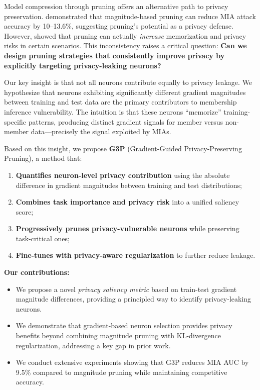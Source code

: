 \documentclass[11pt]{article}
\begin{document}
Model compression through pruning offers an alternative path to privacy preservation. \citet{wang2021against} demonstrated that magnitude-based pruning can reduce MIA attack accuracy by 10--13.6\%, suggesting pruning's potential as a privacy defense. However, \citet{yuan2022membership} showed that pruning can actually \emph{increase} memorization and privacy risks in certain scenarios. This inconsistency raises a critical question: \textbf{Can we design pruning strategies that consistently improve privacy by explicitly targeting privacy-leaking neurons?}

Our key insight is that not all neurons contribute equally to privacy leakage. We hypothesize that neurons exhibiting significantly different gradient magnitudes between training and test data are the primary contributors to membership inference vulnerability. The intuition is that these neurons ``memorize'' training-specific patterns, producing distinct gradient signals for member versus non-member data---precisely the signal exploited by MIAs.

Based on this insight, we propose \textbf{G3P} (Gradient-Guided Privacy-Preserving Pruning), a method that:
\begin{enumerate}
    \item \textbf{Quantifies neuron-level privacy contribution} using the absolute difference in gradient magnitudes between training and test distributions;
    \item \textbf{Combines task importance and privacy risk} into a unified saliency score;
    \item \textbf{Progressively prunes privacy-vulnerable neurons} while preserving task-critical ones;
    \item \textbf{Fine-tunes with privacy-aware regularization} to further reduce leakage.
\end{enumerate}

\textbf{Our contributions:}
\begin{itemize}
    \item We propose a novel \emph{privacy saliency metric} based on train-test gradient magnitude differences, providing a principled way to identify privacy-leaking neurons.
    \item We demonstrate that gradient-based neuron selection provides privacy benefits beyond combining magnitude pruning with KL-divergence regularization, addressing a key gap in prior work.
    \item We conduct extensive experiments showing that G3P reduces MIA AUC by 9.5\% compared to magnitude pruning while maintaining competitive accuracy.
\end{itemize}
\end{document}
